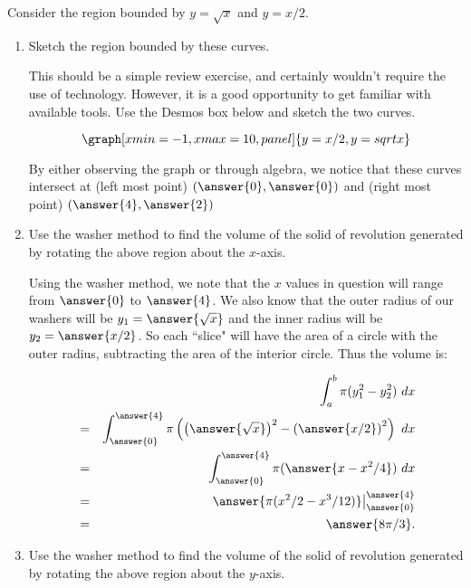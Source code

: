 \documentclass{ximera}
\begin{document}
\begin{question}
Consider the region bounded by $y=\sqrt{x}$ and $y=x/2$.
\begin{enumerate}
\item Sketch the region bounded by these curves.
\begin{explanation}
This should be a simple review exercise, and certainly wouldn't require the use of technology.  However, it is a good opportunity to get familiar with available tools.  Use the Desmos box below and sketch the two curves.

\begin{onlineOnly}
$$\graph[xmin=-1,xmax=10, panel]{y=x/2,y=sqrt{x}}$$
\end{onlineOnly}

By either observing the graph or through algebra, we notice that these curves intersect at (left most point) $(\answer{0}, \answer{0})$ and (right most point) $(\answer{4}, \answer{2})$

\end{explanation}

\item Use the washer method to find the volume of the solid of revolution generated by rotating the above region about the $x$-axis.

\begin{explanation}
Using the washer method, we note that the $x$ values in question will range from $\answer{0}$ to $\answer{4}$.  We also know that the outer radius of our washers will be $y_1=\answer{\sqrt{x}}$ and the inner radius will be $y_2=\answer{x/2}$.  So each ``slice" will have the area of a circle with the outer radius, subtracting the area of the interior circle.  Thus the volume is:

\begin{eqnarray*}
&&\int_a^b \pi(y_1^2-y_2^2)\ dx\\
&=&\int_{\answer{0}}^{\answer{4}} \pi\left(   \left( \answer{\sqrt{x}}\right)^2  - \left( \answer{x/2}\right)^2   \right)\ dx\\
&=&\int_{\answer{0}}^{\answer{4}} \pi(\answer{x-x^2/4})\ dx\\
&=&\answer{\pi(x^2/2-x^3/12)}\big|_{\answer{0}}^{\answer{4}}\\
&=&\answer{8\pi/3}.
\end{eqnarray*}



\end{explanation}

\item Use the washer method to find the volume of the solid of revolution generated by rotating the above region about the $y$-axis.


\end{enumerate}
\end{question}
\end{document}
